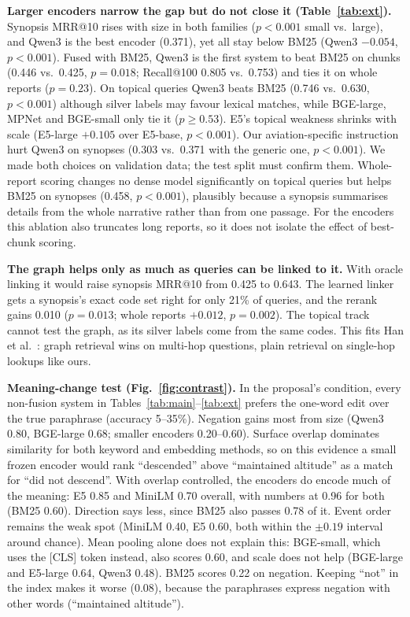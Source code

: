 \documentclass[conference]{IEEEtran}
\begin{document}
\textbf{Larger encoders narrow the gap but do not close it (Table~\ref{tab:ext}).}
Synopsis MRR@10 rises with size in both families ($p<0.001$ small vs.\ large), and Qwen3 is the best encoder (0.371), yet all stay below BM25 (Qwen3
$-0.054$, $p<0.001$). Fused with BM25, Qwen3 is the first system to beat BM25 on chunks
(0.446 vs.\ 0.425, $p{=}0.018$; Recall@100 0.805 vs.\ 0.753) and ties it on whole reports
($p{=}0.23$). On topical queries Qwen3 beats BM25 (0.746 vs.\ 0.630, $p<0.001$) although
silver labels may favour lexical matches, while BGE-large, MPNet and BGE-small only tie it
($p\ge0.53$). E5's topical weakness shrinks with scale (E5-large $+0.105$ over E5-base,
$p<0.001$). Our aviation-specific instruction hurt Qwen3 on synopses (0.303 vs.\ 0.371 with
the generic one, $p<0.001$). We made both choices on validation data; the test split must
confirm them. Whole-report scoring changes no dense model
significantly on topical queries but helps BM25 on synopses (0.458, $p<0.001$), plausibly
because a synopsis summarises details from the whole narrative rather than from one
passage. For the encoders this ablation also truncates long reports, so it does not
isolate the effect of best-chunk scoring.

\textbf{The graph helps only as much as queries can be linked to it.} With oracle
linking it would raise synopsis MRR@10 from 0.425 to 0.643. The learned linker gets a synopsis's exact code set right for only 21\% of queries,
and the rerank gains 0.010 ($p{=}0.013$; whole reports $+0.012$, $p{=}0.002$). The topical
track cannot test the graph, as its silver labels come from the same codes. This fits Han
et al.\ \cite{han2025ragvsgraphrag}: graph retrieval wins on multi-hop questions, plain
retrieval on single-hop lookups like ours.

\textbf{Meaning-change test (Fig.~\ref{fig:contrast}).} In the proposal's condition, every
non-fusion system in Tables~\ref{tab:main}--\ref{tab:ext} prefers the one-word edit over
the true paraphrase (accuracy 5--35\%). Negation gains most from size (Qwen3 0.80,
BGE-large 0.68; smaller encoders 0.20--0.60). Surface
overlap dominates similarity for both keyword and embedding methods, so on this evidence
a small frozen encoder would rank ``descended'' above ``maintained altitude'' as a match
for ``did not descend''. With overlap controlled, the encoders do encode much of the meaning:
E5 0.85 and MiniLM 0.70 overall, with numbers at 0.96 for both (BM25 0.60). Direction
says less, since BM25 also passes 0.78 of it. Event order remains the weak spot (MiniLM
0.40, E5 0.60, both within the $\pm0.19$ interval around chance). Mean pooling alone does
not explain this: BGE-small, which uses the [CLS] token instead, also scores 0.60, and
scale does not help (BGE-large and E5-large 0.64, Qwen3 0.48).
BM25 scores 0.22 on negation. Keeping ``not'' in the index makes it worse (0.08), because
the paraphrases express negation with other words (``maintained altitude'').
\end{document}
